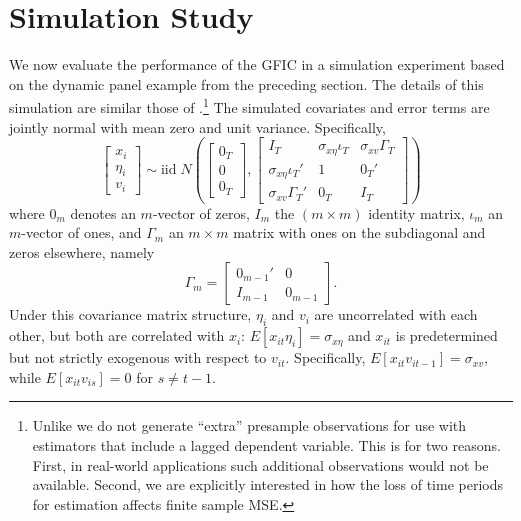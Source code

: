 \section{Simulation Study}
\label{sec:simulation}
We now evaluate the performance of the GFIC in a simulation experiment based on the dynamic panel example from the preceding section. 
The details of this simulation are similar those of \cite{AndrewsLu}.\footnote{Unlike \cite{AndrewsLu} we do not generate ``extra'' presample observations for use with estimators that include a lagged dependent variable. This is for two reasons. First, in real-world applications such additional observations would not be available. Second, we are explicitly interested in how the loss of time periods for estimation affects finite sample MSE.} 
The simulated covariates and error terms are jointly normal with mean zero and unit variance. 
Specifically,
	\begin{equation}
	\label{eq:covar}
		\left[\begin{array}{c}
			x_{i}\\
			\eta_i\\
			v_{i}
	 \end{array} \right]\sim \mbox{iid}\; N\left(\left[\begin{array}{c}0_T\\ 0\\ 0_T \end{array}\right] ,\left[\begin{array}{ccc}
	 	 I_T & \sigma_{x\eta}\iota_T&\sigma_{xv}\Gamma_T \\
	 		\sigma_{x\eta}\iota_T'& 1&0_T' \\
	 		\sigma_{xv}\Gamma_T'& 0_T&  I_T
	 \end{array}\right]\right)
	\end{equation}
where $0_m$ denotes an $m$-vector of zeros, $I_m$ the $(m\times m)$ identity matrix, $\iota_m$ an $m$-vector of ones, and $\Gamma_m$ an $m\times m$ matrix with ones on the subdiagonal and zeros elsewhere, namely
	\begin{equation}
		\Gamma_m = \left[\begin{array}{cc}
	 	0_{m-1}' & 0\\
	 	I_{m-1} & 0_{m-1}
	 \end{array}\right].
	\end{equation}
Under this covariance matrix structure, $\eta_i$ and $v_{i}$ are uncorrelated with each other, but both are correlated with $x_{i}$: $E[x_{it}\eta_i]=\sigma_{x\eta}$ and $x_{it}$ is predetermined but not strictly exogenous with respect to $v_{it}$. Specifically, $E[x_{it}v_{it-1}]=\sigma_{xv}$, while $E[x_{it}v_{is}]=0$ for $s\neq t-1$. 

